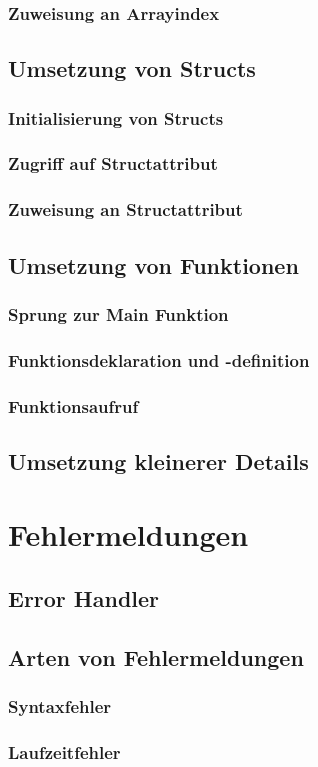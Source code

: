 \subsubsection{Zuweisung an Arrayindex}
\subsection{Umsetzung von Structs}
\subsubsection{Initialisierung von Structs}
\subsubsection{Zugriff auf Structattribut}
\subsubsection{Zuweisung an Structattribut}
\subsection{Umsetzung von Funktionen}
\subsubsection{Sprung zur Main Funktion}
\subsubsection{Funktionsdeklaration und -definition}
\subsubsection{Funktionsaufruf}
\subsection{Umsetzung kleinerer Details}
\section{Fehlermeldungen}
\subsection{Error Handler}
\subsection{Arten von Fehlermeldungen}
\subsubsection{Syntaxfehler}
\subsubsection{Laufzeitfehler}
